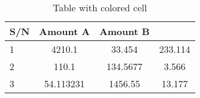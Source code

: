 \documentclass{article}
\begin{document}
	\begin{table}
		\begin{center}
			\caption{Table with colored cell}
			\label{tab:table1}
			\begin{tabular}{l|c|c|c|}
				\hline
				\textbf{S/N} & \textbf{Amount A} & \textbf{Amount B}&\\
				\hline
				\cellcolor{blue!25}1 &4210.1 & 33.454 & 233.114\\
				\cellcolor{green!20}2 & 110.1 & 134.5677 & 3.566\\
				\cellcolor{red!35}3 & 54.113231 & 1456.55 & 13.177\\
				\hline
			\end{tabular}		
		\end{center}
	\end{table}
\end{document}
